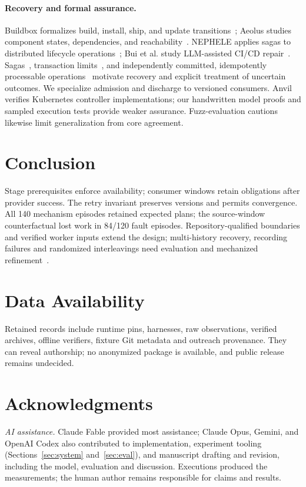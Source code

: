 \paragraph{Recovery and formal assurance.}
Buildbox formalizes build, install, ship, and update transitions~\cite{liusmith};
Aeolus studies component states, dependencies, and reachability~\cite{aeolus}.
NEPHELE applies sagas to distributed lifecycle operations~\cite{nephele};
Bui et al. study LLM-assisted CI/CD repair~\cite{bui}.
Sagas~\cite{sagas}, transaction limits~\cite{gray}, and independently committed,
idempotently processable operations~\cite{helland07,helland12} motivate recovery
and explicit treatment of uncertain outcomes. We specialize admission and
discharge to versioned consumers. Anvil~\cite{anvil} verifies Kubernetes
controller implementations; our handwritten model proofs and sampled execution
tests provide weaker assurance. Fuzz-evaluation cautions~\cite{klees} likewise
limit generalization from core agreement.

\section{Conclusion}
\label{sec:conclusion}
Stage prerequisites enforce availability; consumer windows retain obligations
after provider success. The retry invariant preserves versions and permits
convergence. All 140 mechanism episodes retained expected plans; the
source-window counterfactual lost work in 84/120 fault episodes. Repository-qualified
boundaries and verified worker inputs extend the design; multi-history recovery,
recording failures and randomized interleavings need evaluation and mechanized
refinement~\cite{lamport}.

\section*{Data Availability}
Retained records include runtime pins, harnesses, raw observations, verified
archives, offline verifiers, fixture Git metadata and outreach provenance.
They can reveal authorship; no anonymized package is available, and public
release remains undecided.

\section*{Acknowledgments}
\noindent\textit{AI assistance.}
Claude Fable provided most assistance; Claude Opus, Gemini, and OpenAI Codex
also contributed to implementation, experiment tooling
(Sections~\ref{sec:system} and~\ref{sec:eval}), and manuscript drafting and
revision, including the model, evaluation and discussion. Executions produced
the measurements; the human author remains responsible for claims and results.
